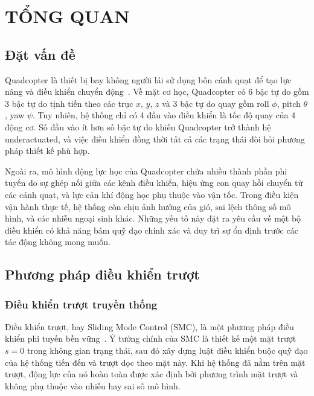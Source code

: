 \documentclass[12pt,a4paper]{report}
\begin{document}
\listoftables
\newpage

\setcounter{page}{1}

\chapter{TỔNG QUAN}

\section{Đặt vấn đề}
Quadcopter là thiết bị bay không người lái sử dụng bốn cánh quạt để tạo lực nâng và điều khiển chuyển động~\cite{bouabdallah2004}. Về mặt cơ học, Quadcopter có 6 bậc tự do gồm 3 bậc tự do tịnh tiến theo các trục $x$, $y$, $z$ và 3 bậc tự do quay gồm roll $\phi$, pitch $\theta$, yaw $\psi$. Tuy nhiên, hệ thống chỉ có 4 đầu vào điều khiển là tốc độ quay của 4 động cơ. Số đầu vào ít hơn số bậc tự do khiến Quadcopter trở thành hệ underactuated, và việc điều khiển đồng thời tất cả các trạng thái đòi hỏi phương pháp thiết kế phù hợp.

Ngoài ra, mô hình động lực học của Quadcopter chứa nhiều thành phần phi tuyến do sự ghép nối giữa các kênh điều khiển, hiệu ứng con quay hồi chuyển từ các cánh quạt, và lực cản khí động học phụ thuộc vào vận tốc. Trong điều kiện vận hành thực tế, hệ thống còn chịu ảnh hưởng của gió, sai lệch thông số mô hình, và các nhiễu ngoại sinh khác. Những yếu tố này đặt ra yêu cầu về một bộ điều khiển có khả năng bám quỹ đạo chính xác và duy trì sự ổn định trước các tác động không mong muốn.

\section{Phương pháp điều khiển trượt}
\subsection{Điều khiển trượt truyền thống}
Điều khiển trượt, hay Sliding Mode Control (SMC), là một phương pháp điều khiển phi tuyến bền vững~\cite{utkin1977,edwards1998}. Ý tưởng chính của SMC là thiết kế một mặt trượt $s = 0$ trong không gian trạng thái, sau đó xây dựng luật điều khiển buộc quỹ đạo của hệ thống tiến đến và trượt dọc theo mặt này. Khi hệ thống đã nằm trên mặt trượt, động lực của nó hoàn toàn được xác định bởi phương trình mặt trượt và không phụ thuộc vào nhiễu hay sai số mô hình.
\end{document}
